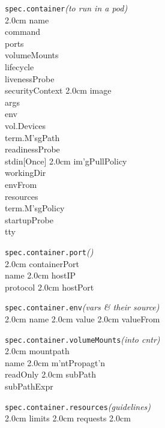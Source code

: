 \texttt{spec.container}\quad\textit{(to run in a pod)}\\[-2mm]
\api
{2.0cm}{
name            \\
command         \\
ports           \\
volumeMounts    \\
lifecycle       \\
livenessProbe   \\
securityContext 
}
{2.0cm}{
image           \\
args            \\
env             \\
vol.Devices     \\
term.M'sgPath   \\
readinessProbe  \\
stdin[Once]     
}
{2.0cm}{
im'gPullPolicy  \\
workingDir      \\
envFrom         \\
resources       \\
term.M'sgPolicy \\
startupProbe    \\
tty             
}
\stopapi

\texttt{spec.container.port}\quad\textit{()}\\[-2mm]
\api
{2.0cm}{
containerPort       \\
name                
}
{2.0cm}{
hostIP              \\
protocol            
}
{2.0cm}{
hostPort            \\
}
\stopapi


\texttt{spec.container.env}\quad\textit{(vars \& their source)}\\[-2mm]
\api
{2.0cm}{
name
}
{2.0cm}{
value
}
{2.0cm}{
valueFrom
}
\stopapi


\texttt{spec.container.volumeMounts}\quad\textit{(into cntr)}\\[-2mm]
\api
{2.0cm}{
mountpath          \\
name                
}
{2.0cm}{
m'ntPropagt'n      \\
readOnly            
}
{2.0cm}{
subPath            \\
subPathExpr         
}
\stopapi


\texttt{spec.container.resources}\quad\textit{(guidelines)}\\[-2mm]
\api
{2.0cm}{
limits
}
{2.0cm}{
requests
}
{2.0cm}{
}
\stopapi



